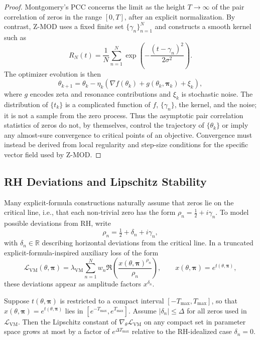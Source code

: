 \documentclass[11pt]{article}
\begin{document}
\begin{proof}
Montgomery's PCC concerns the limit as the height $T\to\infty$ of the pair correlation of zeros in the range $[0,T]$, after an explicit normalization. By contrast, Z-MOD uses a fixed finite set $\{\gamma_n\}_{n=1}^N$ and constructs a smooth kernel such as
\[
  R_N(t) = \frac{1}{N}\sum_{n=1}^N \exp\!\left(-\frac{(t-\gamma_n)^2}{2\sigma^2}\right).
\]
The optimizer evolution is then
\[
  \theta_{k+1} = \theta_k - \eta_k\left(\nabla f(\theta_k) + g(\theta_k,\bm{\pi}_k) + \xi_k\right),
\]
where $g$ encodes zeta and resonance contributions and $\xi_k$ is stochastic noise. The distribution of $\{t_k\}$ is a complicated function of $f$, $\{\gamma_n\}$, the kernel, and the noise; it is not a sample from the zero process. Thus the asymptotic pair correlation statistics of zeros do not, by themselves, control the trajectory of $\{\theta_k\}$ or imply any almost-sure convergence to critical points of an objective. Convergence must instead be derived from local regularity and step-size conditions for the specific vector field used by Z-MOD.
\end{proof}

\subsection{RH Deviations and Lipschitz Stability}

Many explicit-formula constructions naturally assume that zeros lie on the critical line, i.e., that each non-trivial zero has the form $\rho_n = \tfrac12 + i\gamma_n$. To model possible deviations from RH, write
\[
  \rho_n = \tfrac12 + \delta_n + i\gamma_n,
\]
with $\delta_n \in \mathbb{R}$ describing horizontal deviations from the critical line. In a truncated explicit-formula-inspired auxiliary loss of the form
\[
  \mathcal{L}_{\mathrm{VM}}(\theta,\bm{\pi})
  = \lambda_{\mathrm{VM}}
    \sum_{n=1}^N w_n \Re\!\left(\frac{x(\theta,\bm{\pi})^{\rho_n}}{\rho_n}\right),
  \qquad x(\theta,\bm{\pi}) = e^{t(\theta,\bm{\pi})},
\]
these deviations appear as amplitude factors $x^{\delta_n}$.

\begin{lemma}
Suppose $t(\theta,\bm{\pi})$ is restricted to a compact interval $[-T_{\max}, T_{\max}]$, so that $x(\theta,\bm{\pi}) = e^{t(\theta,\bm{\pi})}$ lies in $[e^{-T_{\max}}, e^{T_{\max}}]$. Assume $|\delta_n|\le \Delta$ for all zeros used in $\mathcal{L}_{\mathrm{VM}}$. Then the Lipschitz constant of $\nabla_\theta \mathcal{L}_{\mathrm{VM}}$ on any compact set in parameter space grows at most by a factor of $e^{\Delta T_{\max}}$ relative to the RH-idealized case $\delta_n=0$.
\end{lemma}
\end{document}
